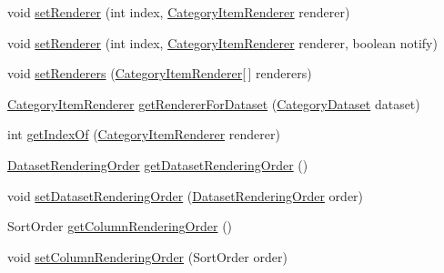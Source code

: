 \begin{DoxyCompactItemize}
\item 
void \mbox{\hyperlink{classorg_1_1jfree_1_1chart_1_1plot_1_1_category_plot_a59619047a04bd5ab557db570e8bb53cb}{set\+Renderer}} (int index, \mbox{\hyperlink{interfaceorg_1_1jfree_1_1chart_1_1renderer_1_1category_1_1_category_item_renderer}{Category\+Item\+Renderer}} renderer)
\item 
void \mbox{\hyperlink{classorg_1_1jfree_1_1chart_1_1plot_1_1_category_plot_abae8165af07c1a9594374eb1da6c8e56}{set\+Renderer}} (int index, \mbox{\hyperlink{interfaceorg_1_1jfree_1_1chart_1_1renderer_1_1category_1_1_category_item_renderer}{Category\+Item\+Renderer}} renderer, boolean notify)
\item 
void \mbox{\hyperlink{classorg_1_1jfree_1_1chart_1_1plot_1_1_category_plot_a93f2e8fb14b9cdcfa72b222010774d3c}{set\+Renderers}} (\mbox{\hyperlink{interfaceorg_1_1jfree_1_1chart_1_1renderer_1_1category_1_1_category_item_renderer}{Category\+Item\+Renderer}}\mbox{[}$\,$\mbox{]} renderers)
\item 
\mbox{\hyperlink{interfaceorg_1_1jfree_1_1chart_1_1renderer_1_1category_1_1_category_item_renderer}{Category\+Item\+Renderer}} \mbox{\hyperlink{classorg_1_1jfree_1_1chart_1_1plot_1_1_category_plot_a78f3b5a1b0d09cabbf4369a38ba04991}{get\+Renderer\+For\+Dataset}} (\mbox{\hyperlink{interfaceorg_1_1jfree_1_1data_1_1category_1_1_category_dataset}{Category\+Dataset}} dataset)
\item 
int \mbox{\hyperlink{classorg_1_1jfree_1_1chart_1_1plot_1_1_category_plot_a3b6cd61dd0768f9226d71a083be50d17}{get\+Index\+Of}} (\mbox{\hyperlink{interfaceorg_1_1jfree_1_1chart_1_1renderer_1_1category_1_1_category_item_renderer}{Category\+Item\+Renderer}} renderer)
\item 
\mbox{\hyperlink{classorg_1_1jfree_1_1chart_1_1plot_1_1_dataset_rendering_order}{Dataset\+Rendering\+Order}} \mbox{\hyperlink{classorg_1_1jfree_1_1chart_1_1plot_1_1_category_plot_a697871f5768fb78444390dcfaa9444bd}{get\+Dataset\+Rendering\+Order}} ()
\item 
void \mbox{\hyperlink{classorg_1_1jfree_1_1chart_1_1plot_1_1_category_plot_a9aad5e87ec9423894584f64dd7badf5c}{set\+Dataset\+Rendering\+Order}} (\mbox{\hyperlink{classorg_1_1jfree_1_1chart_1_1plot_1_1_dataset_rendering_order}{Dataset\+Rendering\+Order}} order)
\item 
Sort\+Order \mbox{\hyperlink{classorg_1_1jfree_1_1chart_1_1plot_1_1_category_plot_aa917b1012005f1b7ca9766c1e7b693bd}{get\+Column\+Rendering\+Order}} ()
\item 
void \mbox{\hyperlink{classorg_1_1jfree_1_1chart_1_1plot_1_1_category_plot_a2c7648bb5408634ddf9af63510c52773}{set\+Column\+Rendering\+Order}} (Sort\+Order order)

\end{DoxyCompactItemize}
